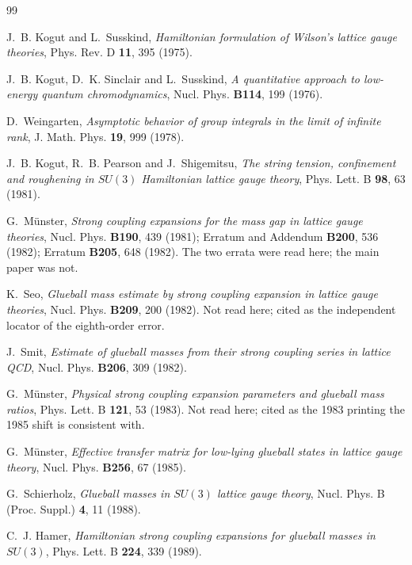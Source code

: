 \documentclass[10pt,twocolumn]{article}
\theoremstyle{plain}
\theoremstyle{definition}
\theoremstyle{remark}
\begin{document}
\begin{thebibliography}{99}\small

 J.~B. Kogut and L.~Susskind,
  \emph{Hamiltonian formulation of Wilson's lattice gauge theories},
  Phys. Rev. D \textbf{11}, 395 (1975).

 J.~B. Kogut, D.~K. Sinclair and L.~Susskind,
  \emph{A quantitative approach to low-energy quantum chromodynamics},
  Nucl. Phys. \textbf{B114}, 199 (1976).

 D.~Weingarten,
  \emph{Asymptotic behavior of group integrals in the limit of infinite rank},
  J. Math. Phys. \textbf{19}, 999 (1978).

 J.~B. Kogut, R.~B. Pearson and J.~Shigemitsu,
  \emph{The string tension, confinement and roughening in $SU(3)$ Hamiltonian
  lattice gauge theory}, Phys. Lett. B \textbf{98}, 63 (1981).

 G.~M\"unster,
  \emph{Strong coupling expansions for the mass gap in lattice gauge theories},
  Nucl. Phys. \textbf{B190}, 439 (1981); Erratum and Addendum
  \textbf{B200}, 536 (1982); Erratum \textbf{B205}, 648 (1982). The two errata
  were read here; the main paper was not.

 K.~Seo,
  \emph{Glueball mass estimate by strong coupling expansion in lattice gauge
  theories}, Nucl. Phys. \textbf{B209}, 200 (1982). Not read here; cited as the
  independent locator of the eighth-order error.

 J.~Smit,
  \emph{Estimate of glueball masses from their strong coupling series in
  lattice QCD}, Nucl. Phys. \textbf{B206}, 309 (1982).

 G.~M\"unster,
  \emph{Physical strong coupling expansion parameters and glueball mass
  ratios}, Phys. Lett. B \textbf{121}, 53 (1983). Not read here; cited as the
  1983 printing the 1985 shift is consistent with.

 G.~M\"unster,
  \emph{Effective transfer matrix for low-lying glueball states in lattice
  gauge theory}, Nucl. Phys. \textbf{B256}, 67 (1985).

 G.~Schierholz,
  \emph{Glueball masses in $SU(3)$ lattice gauge theory},
  Nucl. Phys. B (Proc. Suppl.) \textbf{4}, 11 (1988).

 C.~J. Hamer,
  \emph{Hamiltonian strong coupling expansions for glueball masses in
  $SU(3)$}, Phys. Lett. B \textbf{224}, 339 (1989).


\end{thebibliography}
\end{document}
